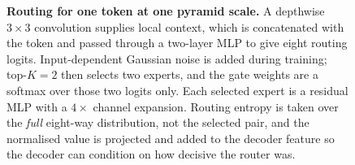 \begin{figure}[htbp]
{\begin{tikzpicture}
\end{tikzpicture}%
}
\caption{\textbf{Routing for one token at one pyramid scale.}
A depthwise $3{\times}3$ convolution supplies local context, which is concatenated with
the token and passed through a two-layer MLP to give eight routing logits.
Input-dependent Gaussian noise is added during training; top-$K{=}2$ then selects two
experts, and the gate weights are a softmax over those two logits only.
Each selected expert is a residual MLP with a $4{\times}$ channel expansion.
Routing entropy is taken over the \emph{full} eight-way distribution, not the selected
pair, and the normalised value is projected and added to the decoder feature so the
decoder can condition on how decisive the router was.}
\label{fig:router}
\end{figure}
